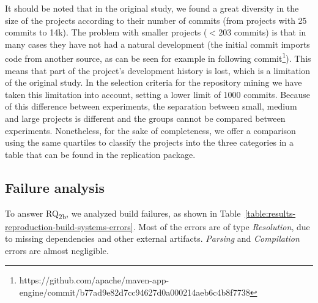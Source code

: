 It should be noted that in the original study, we found a great diversity in the size of the projects according to their number of commits (from projects with 25 commits to 14k).
The problem with smaller projects ($<$203 commits) is that in many cases they have not had a natural development (the initial commit imports code from another source, as can be seen for example in following commit\footnote{https://github.com/apache/maven-app-engine/commit/b77ad9e82d7cc94627d0a000214aeb6c4b8f7738}).
This means that part of the project's development history is lost, which is a limitation of the original study.
In the selection criteria for the repository mining we have taken this limitation into account, setting a lower limit of 1000 commits.
Because of this difference between experiments, the separation between small, medium and large projects is different and the groups cannot be compared between experiments. 
Nonetheless, for the sake of completeness, we offer a comparison using the same quartiles to classify the projects into the three categories in a table that can be found in the replication package.

\vspace{0.2cm}

\subsection{Failure analysis}

To answer RQ\textsubscript{2b}, we analyzed build failures, as shown in Table~\ref{table:results-reproduction-build-systems-errors}. Most of the errors are of type \textit{Resolution}, due to missing dependencies and other external artifacts. \textit{Parsing} and \textit{Compilation} errors are almost negligible.

